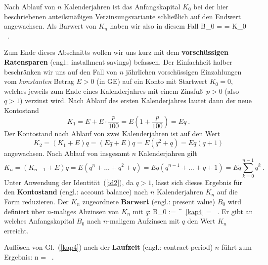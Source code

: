 \medskip
\noindent
Nach Ablauf von $n$ Kalenderjahren ist das
Anfangskapital $K_{0}$ bei der hier beschriebenen
anteilsm\"a\ss igen Verzinsungsvariante schlie\ss lich
auf den Endwert
%
\be
{}
\ee
%
angewachsen. Als Barwert von $K_{n}$ haben wir also in diesem Fall
%
\be
B_{0} =  = K_{0} \ .
\ee
%

\medskip
\noindent
Zum Ende dieses Abschnitts wollen wir uns kurz mit dem
{\bf vorsch\"ussigen Ratensparen} (engl.: installment savings) 
befassen. Der Einfachheit halber beschr\"anken wir uns auf den 
Fall von $n$ j\"ahrlichen vorsch\"ussigen Einzahlungen vom
{\em konstanten\/} Betrag $E>0$ (in GE) auf ein Konto mit
Startwert $K_{0}=0$, welches jeweils zum Ende eines
Kalenderjahres mit einem Zinsfu\ss\ $p>0$ (also $q>1$)
verzinst wird. Nach Ablauf des ersten Kalenderjahres lautet
dann der neue Kontostand
%
\[
K_{1} = E + E\cdot\frac{p}{100}
= E\left(1+\frac{p}{100}\right)
= Eq \ .
\]
%
Der Kontostand nach Ablauf von zwei Kalenderjahren ist auf
den Wert
%
\[
K_{2} = (K_{1}+E)q = (Eq+E)q = E(q^{2}+q) = Eq(q+1)
\]
%
angewachsen. Nach Ablauf von insgesamt $n$ Kalenderjahren
gilt
%
\[
K_{n} = (K_{n-1}+E)q = E(q^{n}+\ldots+q^{2}+q)
= Eq(q^{n-1}+\ldots+q+1)
= Eq\sum_{k=0}^{n-1}q^{k} \ .
\]
%
Unter Anwendung der Identit\"at~(\ref{id2}), da $q>1$,
l\"asst sich dieses Ergebnis f\"ur den {\bf Kontostand}
(engl.: account balance) nach $n$ Kalenderjahren $K_{n}$ auf die 
Form
%
\be
{}
\ee
%
reduzieren. Der $K_{n}$ zugeordnete {\bf Barwert} (engl.: present 
value) $B_{0}$ wird definiert \"uber $n$-maliges Abzinsen von 
$K_{n}$ mit $q$:
%
\be
B_{0} := 
\overbrace{=}^{~\ref{kap4}}
 =  \ .
\ee
%
Er gibt an welches Anfangskapital $B_{0}$ nach $n$-maligem
Aufzinsen mit $q$ den Wert $K_{n}$ erreicht.

\medskip
\noindent
Aufl\"osen von Gl.~(\ref{kap4}) nach der {\bf Laufzeit} (engl.: 
contract period) $n$ f\"uhrt zum Ergebnis:
%
\be
n =  \ .
\ee
%

